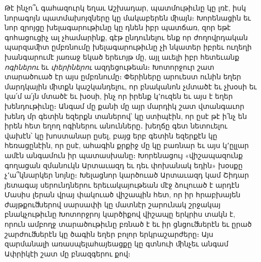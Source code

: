 \documentclass{article}
\begin{document}
{Թէ ինչո՞ւ գահազուրկ եղաւ Աշխադար, պատմութիւնը կը լռէ, իսկ նորագոյն պատմախոյզները կը մակաբերեն ﬕայն։ Խորենացին եւ նոր զրոյցը խելագարութիւնը կը դնեն իբր պատճառ, զոր եթէ գոհացուցիչ ալ չհամարինք, գէթ ընդունելու ենք որ ժողովրդական պարզաﬕտ ըմբռնումը խելագարութիւնը չի նկատեր իբրեւ ուղեղի խանգարումէ յառաջ եկած երեւոյթ մը, այլ աւելի իբր հետեւանք \emph{ոգիներու} եւ \emph{փերիներու} ազդեցութեան։ Խոտորջուր շատ տարածուած էր այս ըմբռնումը։ Փերիները արուեստ ունին եղեր մարդկային ﬕտքն կաշկանդելու, որ բնականոն չմտածէ եւ չխօսի եւ կա՛մ ա՛յն մտածէ եւ խօսի, ինչ որ իրենք կ՚ուզեն եւ այս է եղեր խենդութիւնը։ Անգամ մը քանի մը այր մարդիկ շատ վտանգաւոր խենդ մր գետին եզերքն տաներով՝ կը ստիպէին, որ ըսէ թէ ի՛նչ են իրեն հետ եղող ոգիներու անունները․ խեղճը գետ նետուելու վախէն՝ կը խոստանար ըսել, բայց երբ գետին եզերքէն կը հեռացընէին, որ ըսէ, ահագին քրքիջ մը կը բառնար եւ այս կ՚ըլլար ամէն անգամուն իր պատասխանը։ Խորենացույ «վիշապազունք գողացան զմանուկն Արտաւազդ եւ դեւ փոխանակ եդին» խօսքը չ՚ա՞կնարկեր նոյնը։ Խելացնոր կարծուած Արտաւազդ կամ Շիդար յետագայ սերունդներու երեւակայութեան մէջ ձուլուած է արդէն Մասիս լերան վրայ փակուած վիշապին հետ, որ իր հրաբխայեն ժայթքուﬓերով սարսափի կը մատնէր շարունակ շրջակայ բնակչութիւնը Խոտորջրոյ կարծիքով վիշապը երկրիս տակն է, որուն ամբողջ տարածութիւնը բռնած է եւ իր ցնցուﬓերէն եւ ըրած շարժուﬓերէն կը ծագին եղեր բոլոր երկրաշարժերը։ Այս զարմանալի առասպելահայեացքը կը գտնուի ﬕնչեւ անգամ Ափրիկէի շատ մը բնազգերու քով։

}
\end{document}

